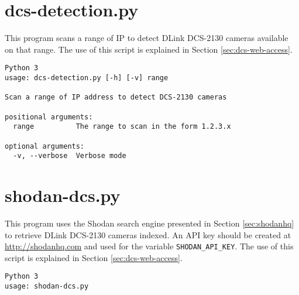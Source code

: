 \section{dcs-detection.py}

This program scans a range of IP to detect DLink DCS-2130 cameras available on that range.
The use of this script is explained in Section \ref{sec:dcs-web-access}.

\begin{verbatim}
Python 3
usage: dcs-detection.py [-h] [-v] range

Scan a range of IP address to detect DCS-2130 cameras

positional arguments:
  range          The range to scan in the form 1.2.3.x

optional arguments:
  -v, --verbose  Verbose mode
\end{verbatim}

\section{shodan-dcs.py}

This program uses the Shodan search engine presented in Section \ref{sec:shodanhq} to retrieve DLink DCS-2130 cameras indexed.
An API key should be created at \url{http://shodanhq.com} and used for the variable \texttt{SHODAN\_API\_KEY}.
The use of this script is explained in Section \ref{sec:dcs-web-access}.

\begin{verbatim}
Python 3
usage: shodan-dcs.py
\end{verbatim}